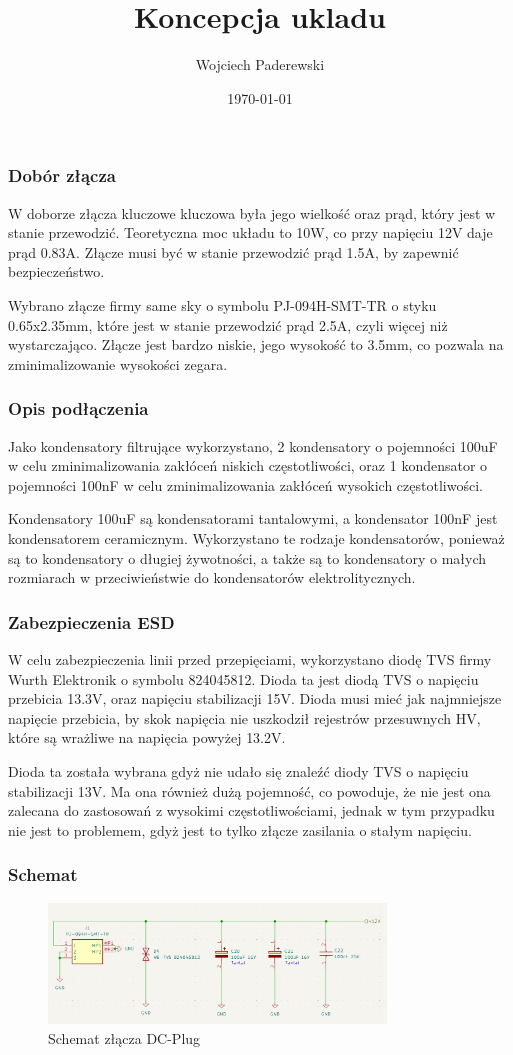 \documentclass[../../main.tex]{subfiles}
\author{Wojciech Paderewski}
\date{\today}
\title{Koncepcja ukladu}
\begin{document}
\subsubsection{Dobór złącza}
W doborze złącza kluczowe kluczowa była jego wielkość oraz prąd, który jest w stanie przewodzić. Teoretyczna moc układu to 10W,
co przy napięciu 12V daje prąd 0.83A. Złącze musi być w stanie przewodzić prąd 1.5A, by zapewnić bezpieczeństwo. 

Wybrano złącze firmy same sky o symbolu PJ-094H-SMT-TR o styku 0.65x2.35mm, które jest w stanie przewodzić prąd 2.5A, czyli więcej niż wystarczająco.
Złącze jest bardzo niskie, jego wysokość to 3.5mm, co pozwala na zminimalizowanie wysokości zegara.
\subsubsection{Opis podłączenia}
Jako kondensatory filtrujące wykorzystano, 2 kondensatory o 
pojemności 100uF w celu zminimalizowania zakłóceń niskich częstotliwości, oraz 1 kondensator o pojemności 100nF w celu zminimalizowania zakłóceń wysokich częstotliwości.

Kondensatory 100uF są kondensatorami tantalowymi, a kondensator 100nF jest kondensatorem ceramicznym. Wykorzystano te rodzaje kondensatorów, 
ponieważ są to kondensatory o długiej żywotności, a także są to kondensatory o małych rozmiarach w przeciwieństwie do kondensatorów elektrolitycznych.
\subsubsection{Zabezpieczenia ESD}
W celu zabezpieczenia linii przed przepięciami, wykorzystano diodę TVS firmy Wurth Elektronik o symbolu 824045812. Dioda ta jest diodą TVS o napięciu przebicia 13.3V,
oraz napięciu stabilizacji 15V. Dioda musi mieć jak najmniejsze napięcie przebicia, by skok napięcia nie uszkodził rejestrów przesuwnych HV, które są wrażliwe na napięcia powyżej 13.2V.

Dioda ta została wybrana gdyż nie udało się znaleźć diody TVS o napięciu stabilizacji 13V. Ma ona również dużą pojemność, co powoduje, że nie jest ona zalecana do 
zastosowań z wysokimi częstotliwościami, jednak w tym przypadku nie jest to problemem, gdyż jest to tylko złącze zasilania o stałym napięciu.
\subsubsection{Schemat}
\begin{figure}[H]
    \centering
    \includegraphics[width=0.8\textwidth]{DcPlug_schemat.png}
    \caption{Schemat złącza DC-Plug}
\end{figure}
\end{document}
